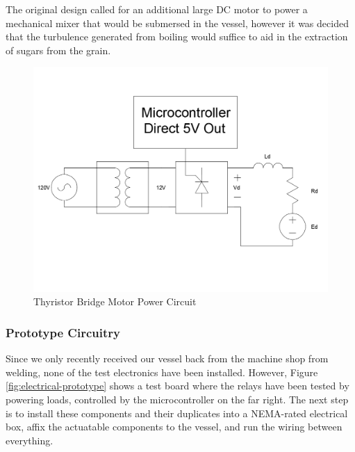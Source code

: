 \documentclass{article}
\begin{document}
\noindent The original design called for an additional large DC motor to power a mechanical mixer that would be submersed in the vessel, however it was decided that the turbulence generated from boiling would suffice to aid in the extraction of sugars from the grain.

\begin{figure}[H]
\begin{center}
\includegraphics[scale=0.20]{motor-thyristor-dc-circuit.png}
\caption{Thyristor Bridge Motor Power Circuit}
\label{fig:motor-thyristor-dc-circuit}
\end{center}
\end{figure}

\subsubsection{Prototype Circuitry}
Since we only recently received our vessel back from the machine shop from welding, none of the test electronics have been installed. However, Figure \ref{fig:electrical-prototype} shows a test board where the relays have been tested by powering loads, controlled by the microcontroller on the far right. The next step is to install these components and their duplicates into a NEMA-rated electrical box, affix the actuatable components to the vessel, and run the wiring between everything.
\end{document}
